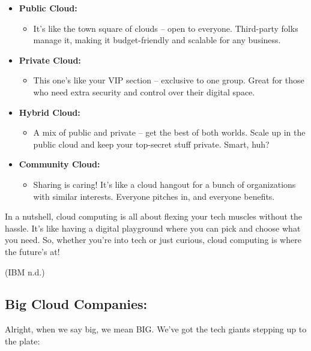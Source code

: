 \documentclass[
  letterpaper,
  DIV=11,
  numbers=noendperiod]{scrreprt}
\providecommand{\tightlist}{%
  \setlength{\itemsep}{0pt}\setlength{\parskip}{0pt}}\usepackage{longtable,booktabs,array}
\begin{document}
\begin{itemize}
\item
  \textbf{Public Cloud:}

  \begin{itemize}
  \tightlist
  \item
    It's like the town square of clouds -- open to everyone. Third-party
    folks manage it, making it budget-friendly and scalable for any
    business.
  \end{itemize}
\item
  \textbf{Private Cloud:}

  \begin{itemize}
  \tightlist
  \item
    This one's like your VIP section -- exclusive to one group. Great
    for those who need extra security and control over their digital
    space.
  \end{itemize}
\item
  \textbf{Hybrid Cloud:}

  \begin{itemize}
  \tightlist
  \item
    A mix of public and private -- get the best of both worlds. Scale up
    in the public cloud and keep your top-secret stuff private. Smart,
    huh?
  \end{itemize}
\item
  \textbf{Community Cloud:}

  \begin{itemize}
  \tightlist
  \item
    Sharing is caring! It's like a cloud hangout for a bunch of
    organizations with similar interests. Everyone pitches in, and
    everyone benefits.
  \end{itemize}
\end{itemize}

In a nutshell, cloud computing is all about flexing your tech muscles
without the hassle. It's like having a digital playground where you can
pick and choose what you need. So, whether you're into tech or just
curious, cloud computing is where the future's at!

(IBM n.d.)

\subsection{Big Cloud Companies:}\label{big-cloud-companies}

Alright, when we say big, we mean BIG. We've got the tech giants
stepping up to the plate:
\end{document}
